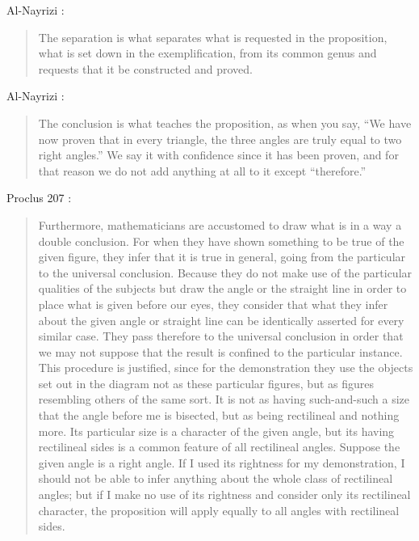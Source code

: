 \documentclass{article}
\begin{document}
Al-Nayrizi \cite[p.~102]{alnayriziI}:

\begin{quote}
The separation is what separates what is requested in the
proposition, what is set down in the exemplification, from its
common genus and requests that it be constructed and proved.
\end{quote}

Al-Nayrizi \cite[p.~103]{alnayriziI}:

\begin{quote}
The conclusion is what teaches the proposition, as when
you say, ``We have now proven that in every triangle, the three angles
are truly equal to two right angles.'' We say it with confidence since it
has been proven, and for that reason we do not add anything at all to
it except ``therefore.'' 
\end{quote}


Proclus 207 \cite[p.~162]{proclus}:

\begin{quote}
Furthermore, mathematicians are accustomed to draw what
is in a way a double conclusion. For when they have shown
something to be true of the given figure, they infer that it is
true in general, going from the particular to the universal
conclusion. Because they do not make use of the particular
qualities of the subjects but draw the angle or the straight
line in order to place what is given before our eyes, they
consider that what they infer about the given angle or straight
line can be identically asserted for every similar case. They
pass therefore to the universal conclusion in order that we
may not suppose that the result is confined to the particular
instance. This procedure is justified, since for the demonstration
they use the objects set out in the diagram not as these
particular figures, but as figures resembling others of the same
sort. It is not as having such-and-such a size that the
angle before me is bisected, but as being rectilineal and 
nothing more. Its particular size is a character of the given angle,
but its having rectilineal sides is a common feature of all rectilineal
angles. Suppose the given angle is a right angle. If
I used its rightness for my demonstration, I should not be
able to infer anything about the whole class of rectilineal
angles; but if I make no use of its rightness and consider 
only its rectilineal character, the proposition will apply
equally to all angles with rectilineal sides.
\end{quote}
\end{document}
